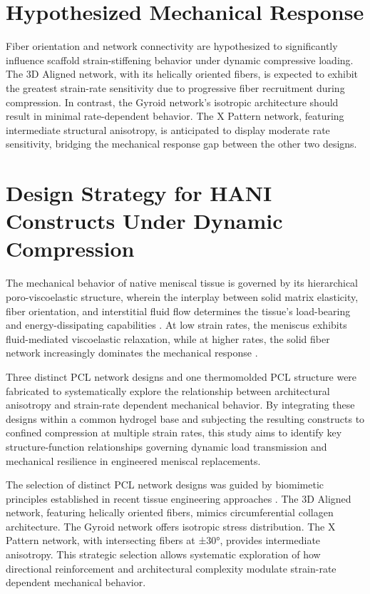 \section{Hypothesized Mechanical Response}
Fiber orientation and network connectivity are hypothesized to significantly influence scaffold strain-stiffening behavior under dynamic compressive loading. The 3D Aligned network, with its helically oriented fibers, is expected to exhibit the greatest strain-rate sensitivity due to progressive fiber recruitment during compression. In contrast, the Gyroid network's isotropic architecture should result in minimal rate-dependent behavior. The X Pattern network, featuring intermediate structural anisotropy, is anticipated to display moderate rate sensitivity, bridging the mechanical response gap between the other two designs.

\section{Design Strategy for HANI Constructs Under Dynamic Compression}

The mechanical behavior of native meniscal tissue is governed by its hierarchical poro-viscoelastic structure, wherein the interplay between solid matrix elasticity, fiber orientation, and interstitial fluid flow determines the tissue's load-bearing and energy-dissipating capabilities \citep{kleinhans2018hydraulicpermeability, morejon2020compressiveproperties}. At low strain rates, the meniscus exhibits fluid-mediated viscoelastic relaxation, while at higher rates, the solid fiber network increasingly dominates the mechanical response \citep{abdelgaied2015comparisonbiomechanical}.

Three distinct PCL network designs and one thermomolded PCL structure were fabricated to systematically explore the relationship between architectural anisotropy and strain-rate dependent mechanical behavior. By integrating these designs within a common hydrogel base and subjecting the resulting constructs to confined compression at multiple strain rates, this study aims to identify key structure-function relationships governing dynamic load transmission and mechanical resilience in engineered meniscal replacements.

The selection of distinct PCL network designs was guided by biomimetic principles established in recent tissue engineering approaches \citep{szojka2017biomimetic3d}. The 3D Aligned network, featuring helically oriented fibers, mimics circumferential collagen architecture. The Gyroid network offers isotropic stress distribution. The X Pattern network, with intersecting fibers at ±30°, provides intermediate anisotropy. This strategic selection allows systematic exploration of how directional reinforcement and architectural complexity modulate strain-rate dependent mechanical behavior.


